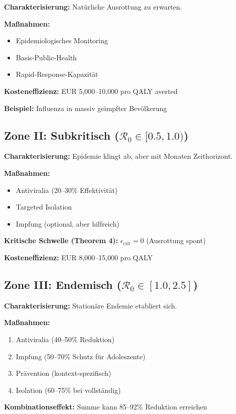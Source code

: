 ﻿\documentclass[a4paper,12pt,twoside]{article}
\theoremstyle{definition}
\begin{document}
\textbf{Charakterisierung:} Natürliche Ausrottung zu erwarten.

\textbf{Maßnahmen:}
\begin{itemize}
\item Epidemiologisches Monitoring
\item Basis-Public-Health
\item Rapid-Response-Kapazität
\end{itemize}

\textbf{Kosteneffizienz:} EUR 5,000--10,000 pro QALY averted

\textbf{Beispiel:} Influenza in massiv geimpfter Bevölkerung

\subsection{Zone II: Subkritisch ($\mathcal{R}_0 \in [0.5, 1.0)$)}

\textbf{Charakterisierung:} Epidemie klingt ab, aber mit Monaten Zeithorizont.

\textbf{Maßnahmen:}
\begin{itemize}
\item Antiviralia (20--30\% Effektivität)
\item Targeted Isolation
\item Impfung (optional, aber hilfreich)
\end{itemize}

\textbf{Kritische Schwelle (Theorem 4):} $\epsilon_{\text{crit}} = 0$ (Ausrottung spont)

\textbf{Kosteneffizienz:} EUR 8,000--15,000 pro QALY

\subsection{Zone III: Endemisch ($\mathcal{R}_0 \in [1.0, 2.5]$)}

\textbf{Charakterisierung:} Stationäre Endemie etabliert sich.

\textbf{Maßnahmen:}
\begin{enumerate}
\item Antiviralia (40--50\% Reduktion)
\item Impfung (50--70\% Schutz für Adoleszente)
\item Prävention (kontext-spezifisch)
\item Isolation (60--75\% bei vollständig)
\end{enumerate}

\textbf{Kombinationseffekt:} Summe kann 85--92\% Reduktion erreichen
\end{document}
